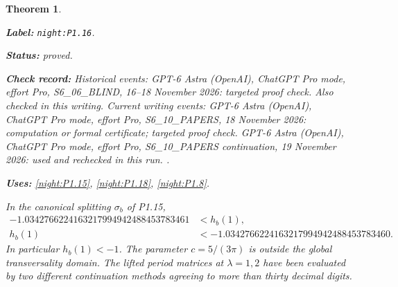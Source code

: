 \documentclass[11pt,a4paper]{article}
\newtheorem{theorem}{Theorem}[section]
\theoremstyle{definition}
\newcommand{\StatementRecord}[4]{\par\smallskip\begingroup\upshape\raggedright\noindent\textbf{Label:} \nolinkurl{#1}.\par\noindent\textbf{Status:} #2.\par\noindent\textbf{Check record:} #3.\par\noindent\textbf{Uses:} #4.\par\endgroup\smallskip}
\begin{document}
\begin{theorem}\label{night:P1.16}
\StatementRecord{night:P1.16}{proved}{Historical events: GPT-6 Astra (OpenAI), ChatGPT Pro mode, effort Pro, S6\_06\_BLIND, 16--18 November 2026: targeted proof check. Also checked in this writing. Current writing events: GPT-6 Astra (OpenAI), ChatGPT Pro mode, effort Pro, S6\_10\_PAPERS, 18 November 2026: computation or formal certificate; targeted proof check. GPT-6 Astra (OpenAI), ChatGPT Pro mode, effort Pro, S6\_10\_PAPERS continuation, 19 November 2026: used and rechecked in this run. }{\cref{night:P1.15}, \cref{night:P1.18}, \cref{night:P1.8}}
In the canonical splitting $\sigma_b$ of P1.15,
\[
\begin{aligned}
-1.0342766224163217994942488453783461&<h_b(1),\\
h_b(1)&<-1.0342766224163217994942488453783460.
\end{aligned}
\]
In particular $h_b(1)<-1$.  The parameter $c=5/(3\pi)$ is outside the
global transversality domain.  The lifted period matrices at
$\lambda=1,2$ have been evaluated by two different continuation methods
agreeing to more than thirty decimal digits.
\end{theorem}
\end{document}
